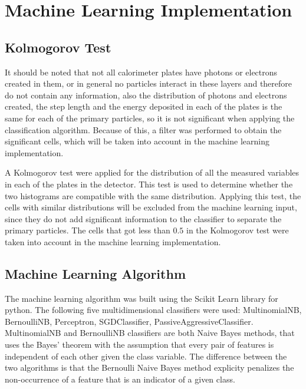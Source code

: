 \section{Machine Learning Implementation}

\subsection{Kolmogorov Test}

It should be noted that not all calorimeter plates have photons or electrons
created in them, or in general no particles interact in these layers and
therefore do not contain any information, also the distribution of photons and
electrons created, the step length and the energy deposited in each of the
plates is the same for each of the primary particles, so it is not significant
when applying the classification algorithm. Because of this, a filter was
performed to obtain the significant cells, which will be taken into account in
the machine learning implementation.

A Kolmogorov test were applied for the distribution of all the measured
variables in each of the plates in the detector. This test is used to determine
whether the two histograms are compatible with the same
distribution\cite{root,kolmogorov}. Applying this test, the cells with similar
distributions will be excluded from the machine learning input, since they do
not add significant information to the classifier to separate the primary
particles. The cells that got less than \(0.5\) in the Kolmogorov test were
taken into account in the machine learning implementation.

\subsection{Machine Learning Algorithm}

The machine learning algorithm was built using the Scikit Learn library for
python. The following five multidimensional classifiers were used:
MultinomialNB, BernoulliNB, Perceptron, SGDClassifier,
PassiveAggressiveClassifier. MultinomialNB and BernoulliNB classifiers are both
Naive Bayes methods, that uses the Bayes’ theorem with the assumption that
every pair of features is independent of each other given the class
variable\cite{zhang2004optimality,NBsklearn,scikit-learn}. The difference
between the two algorithms is that the Bernoulli Naive Bayes method explicity
penalizes the non-occurrence of a feature that is an indicator of a given
class\cite{NBsklearn}.

